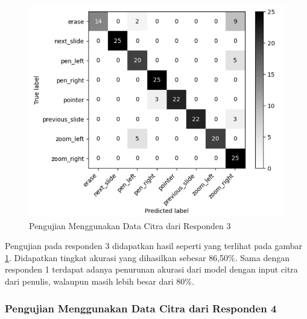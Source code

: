 \begin{figure}[ht]
  \centering
  \includegraphics[scale=0.55]{gambar/pengujian-ukuran-tangan/tangan-meril.png}
  \caption{Pengujian Menggunakan Data Citra dari Responden 3}
  \label{fig:Pengujian Menggunakan Data Citra dari Responden 3}
\end{figure}

Pengujian pada responden 3 didapatkan hasil seperti yang terlihat pada gambar \ref{fig:Pengujian Menggunakan Data Citra dari Responden 3}. Didapatkan tingkat akurasi yang dihasilkan sebesar 86,50\%. Sama dengan responden 1 terdapat adanya penurunan akurasi dari model dengan input citra dari penulis, walaupun masih lebih besar dari 80\%. 

\subsubsection{Pengujian Menggunakan Data Citra dari Responden 4}
\label{subsec:Pengujian Menggunakan Data Citra dari Responden 4}

